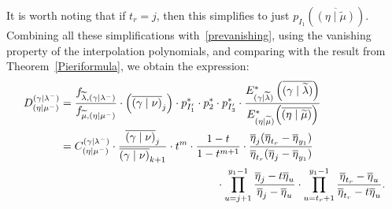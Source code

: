 \documentclass[ALCO]{cedram}
\newcommand{\Estar}[1]{E^*_{#1}}
\newcommand{\gammalambdamin}{{(\gamma \mid \lambda^-)}}
\newcommand{\gammanu}{{(\gamma \mid \nu)}}
\newcommand{\mutilde}{{\widetilde{\mu}}}
\newcommand{\lambdatilde}{{\widetilde{\lambda}}}
\newcommand{\gammalambdatilde}{{(\gamma \mid \lambdatilde)}}
\newcommand{\etamutilde}{{(\eta \mid \widetilde{\mu})}}
\newcommand{\etamumin}{{(\eta \mid \mu^-)}}
\newcommand{\DBaratta}{D_{\etamumin}^\gammalambdamin}
\newcommand{\pstarone}{p^*_{I'_1}}
\newcommand{\pstartwo}{p^*_2}
\newcommand{\pstarthree}{p^*_{I'_3}}
\begin{document}
It is worth noting that if $t_r=j$, then this simplifies to just $p_{I_1}\left(\overline{\etamutilde} \right)$. Combining all these simplifications with~\eqref{prevanishing}, using the vanishing property of the interpolation polynomials, and comparing with the result from Theorem~\ref{Pieriformula}, we obtain the expression:
\begin{align*}\label{nonsymmetricpieri}     \DBaratta &=  \frac{f_{\lambdatilde,\gammalambdamin}}{f_{\mutilde,\etamumin}} \cdot \left( \overline{\gammanu}_j\right) \cdot \pstarone \cdot \pstartwo \cdot \pstarthree \cdot \frac{  \Estar{\gammalambdatilde} \left( \overline{\gammalambdatilde}\right)}{\Estar{\etamutilde}{\left(\overline{\etamutilde}\right)}}\\
&= C_{\etamumin}^{\gammalambdamin} \cdot \frac{ \overline{\gammanu}_j}{ \overline{\gammanu}_{k+1}} \cdot t^m \cdot \frac{1-t}{1-t^{m+1}} \cdot  \frac{\overline{\eta}_j(\overline{\eta}_{t_r} - \overline{\eta}_{y_1})}{\overline{\eta}_{t_r}(\overline{\eta}_j-\overline{\eta}_{y_1})}\\ &\hspace*{5cm}\cdot \prod_{u=j+1}^{y_1-1} \frac{\overline{\eta}_j-t\overline{\eta}_u}{\overline{\eta}_j-\overline{\eta}_u} \cdot \prod_{u=t_r+1}^{y_1-1} \frac{\overline{\eta}_{t_r}-\overline{\eta}_u}{\overline{\eta}_{t_r}-t\overline{\eta}_u}.\end{align*}
\end{document}
